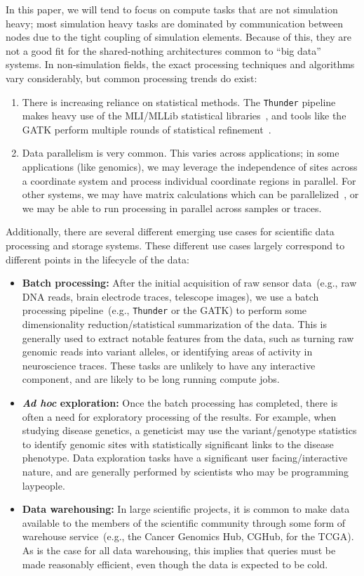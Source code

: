 \documentclass{acm_proc_article-sp}
\begin{document}
In this paper, we will tend to focus on compute tasks that are not simulation heavy; most simulation heavy
tasks are dominated by communication between nodes due to the tight coupling of simulation elements.
Because of this, they are not a good fit for the shared-nothing architectures common to ``big data'' systems.
In non-simulation fields, the exact processing techniques and algorithms vary considerably, but common
processing trends do exist:

\begin{enumerate}
\item There is increasing reliance on statistical methods. The \texttt{Thunder} pipeline makes heavy use
of the MLI/MLLib statistical libraries~\cite{freeman14, sparks13}, and tools like the GATK perform multiple
rounds of statistical refinement~\cite{depristo11}.
\item Data parallelism is very common. This varies across applications; in some applications (like
genomics), we may leverage the independence of sites across a coordinate system and process individual
coordinate regions in parallel. For other systems, we may have matrix calculations which can be
parallelized~\cite{sparks13}, or we may be able to run processing in parallel across samples or traces.
\end{enumerate}

Additionally, there are several different emerging use cases for scientific data processing and storage
systems. These different use cases largely correspond to different points in the lifecycle of the data:

\begin{itemize}
\item \textbf{Batch processing:} After the initial acquisition of raw sensor data~(e.g., raw DNA reads,
brain electrode traces, telescope images), we use a batch processing pipeline~(e.g., \texttt{Thunder} or
the GATK) to perform some dimensionality reduction/statistical summarization of the data. This is generally
used to extract notable features from the data, such as turning raw genomic reads into variant alleles, or
identifying areas of activity in neuroscience traces. These tasks are unlikely to have any interactive
component, and are likely to be long running compute jobs.
\item \textbf{\emph{Ad hoc} exploration:} Once the batch processing has completed, there is often a need
for exploratory processing of the results. For example, when studying disease genetics, a geneticist may
use the variant/genotype statistics to identify genomic sites with statistically significant links to the disease
phenotype. Data exploration tasks have a significant user facing/interactive nature, and are generally
performed by scientists who may be programming laypeople.
\item \textbf{Data warehousing:} In large scientific projects, it is common to make data available to the
members of the scientific community through some form of warehouse service~(e.g., the Cancer Genomics
Hub, CGHub, for the TCGA). As is the case for all data warehousing, this implies that queries must be
made reasonably efficient, even though the data is expected to be cold.
\end{itemize}
\end{document}
